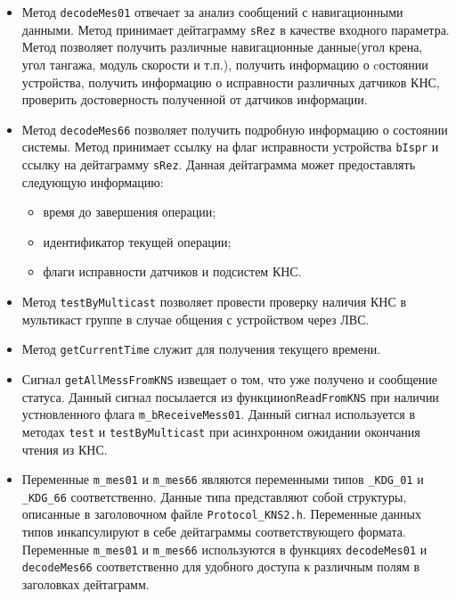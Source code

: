 \begin{itemize}
	\item Метод \texttt{decodeMes01} отвечает за анализ сообщений с навигационными данными. Метод принимает
		дейтаграмму \texttt{sRez} в качестве входного параметра. Метод позволяет получить
		различные навигационные данные(угол крена, угол тангажа, модуль скорости и т.п.), получить информацию о
		cостоянии устройства, получить информацию о исправности различных датчиков КНС, проверить достоверность
		полученной от датчиков информации.

	\item Метод \texttt{decodeMes66} позволяет получить подробную информацию о состоянии системы. Метод принимает
		ссылку на флаг исправности устройства \texttt{bIspr} и ссылку на дейтаграмму \texttt{sRez}. Данная
		дейтаграмма может предоставлять следующую информацию:
		\begin{itemize}
				\item время до завершения операции;
				\item идентификатор текущей операции;
				\item флаги исправности датчиков и подсистем КНС.
		\end{itemize}

	\item Метод \texttt{testByMulticast} позволяет провести проверку наличия КНС в мультикаст группе в случае
		общения с устройством через ЛВС.

	\item Метод \texttt{getCurrentTime} служит для получения текущего времени.

	\item Сигнал \texttt{getAllMessFromKNS} извещает о том, что уже получено и сообщение статуса. Данный сигнал
		посылается из функции\break \texttt{onReadFromKNS} при наличии
		устновленного флага
		\texttt{m\_bReceiveMess01}. Данный сигнал используется в методах
		\texttt{test} и \texttt{testByMulticast} при асинхронном ожидании окончания чтения из КНС.

	\item Переменные \texttt{m\_mes01} и \texttt{m\_mes66} являются переменными типов \texttt{\_KDG\_01} и
		\texttt{\_KDG\_66} соответственно. Данные типа представляют собой структуры, описанные в заголовочном
		файле \texttt{Protocol\_KNS2.h}. Переменные данных типов инкапсулируют в себе дейтаграммы
		соответствующего формата. Переменные \texttt{m\_mes01} и \texttt{m\_mes66} используются в функциях
		\texttt{decodeMes01} и \texttt{decodeMes66} соответственно для удобного доступа к различным полям в
		заголовках дейтаграмм.
\end{itemize}

